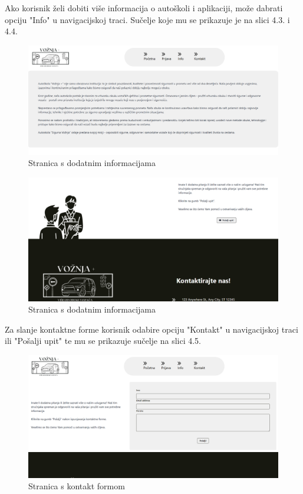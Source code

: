 \noindent Ako korisnik želi dobiti više informacija o autoškoli i aplikaciji, može dabrati opciju "Info" u navigacijskoj traci. Sučelje koje mu se prikazuje je na slici 4.3. i 4.4.

\begin{figure}[H]
					\includegraphics[width=\textwidth]{slike/anoniman3.png} 
					\centering
					\caption{Stranica s dodatnim informacijama}
					\label{fig:promjene}
				\end{figure}

    
\begin{figure}[H]
					\includegraphics[width=\textwidth]{slike/anoniman4.png} 
					\centering
					\caption{Stranica s dodatnim informacijama}
					\label{fig:promjene}
				\end{figure}

\noindent Za slanje kontaktne forme korisnik odabire opciju "Kontakt" u navigacijskoj traci ili "Pošalji upit" te mu se prikazuje sučelje na slici 4.5.

\begin{figure}[H]
					\includegraphics[width=\textwidth]{slike/anoniman5.png} 
					\centering
					\caption{Stranica s kontakt formom}
					\label{fig:promjene}
				\end{figure}


